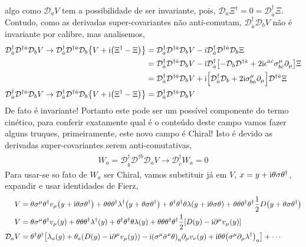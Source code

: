 algo como $\mathcal D_a V$ tem a possibilidade de ser invariante, pois, $\mathcal D_a\Xi^\dagger=0=\mathcal D^\dagger_{\dot a}\Xi$. Contudo, como as derivadas super-covariantes não anti-comutam, $\mathcal D^\dagger_{\dot a}\mathcal D_b V$ não é invariante por calibre, mas analisemos,
\begin{align*}
    \mathcal D^\dagger_{\dot a}\mathcal D^{\dagger \dot a}\mathcal D_b V\rightarrow\mathcal D^\dagger_{\dot a}\mathcal D^{\dagger \dot a}\mathcal D_b \qty{V+\textnormal{i}\qty(\Xi^\dagger-\Xi)}&=\mathcal D^\dagger_{\dot a}\mathcal D^{\dagger \dot a}\mathcal D_b V-\textnormal{i}\mathcal D^\dagger_{\dot a}\mathcal D^{\dagger \dot a}\mathcal D_b \Xi\\
    &=\mathcal D^\dagger_{\dot a}\mathcal D^{\dagger \dot a}\mathcal D_b V-\textnormal{i}\mathcal D^\dagger_{\dot a}\qty[-\mathcal D_b\mathcal D^{\dagger \dot a} +2\textnormal{i}\epsilon^{\dot a\dot c}\sigma^{\mu}_{b\dot c}\partial_\mu]\Xi\\
    &=\mathcal D^\dagger_{\dot a}\mathcal D^{\dagger \dot a}\mathcal D_b V+\textnormal{i}\qty[\mathcal D^\dagger_{\dot a}\mathcal D_b +2\textnormal{i}\sigma^{\mu}_{b\dot a}\partial_\mu]\mathcal D^{\dagger \dot a}\Xi\\
    \mathcal D^\dagger_{\dot a}\mathcal D^{\dagger \dot a}\mathcal D_b V\rightarrow\mathcal D^\dagger_{\dot a}\mathcal D^{\dagger \dot a}\mathcal D_b \qty{V+\textnormal{i}\qty(\Xi^\dagger-\Xi)}&=\mathcal D^\dagger_{\dot a}\mathcal D^{\dagger \dot a}\mathcal D_b V
\end{align*}
De fato é invariante! Portanto este pode ser um possível componente do termo cinético, para conferir exatamente qual é o conteúdo deste campo vamos fazer alguns truques, primeiramente, este novo campo é Chiral! Isto é devido as 
derivadas super-covariantes serem anti-comutativas,
\begin{align*}
    W_a=\mathcal D^\dagger_{\dot b}\mathcal D^{\dagger \dot b}\mathcal D_a V\rightarrow \mathcal D^\dagger_{\dot c}W_a=0
\end{align*}
Para usar-se so fato de $W_a$ ser Chiral, vamos substituir já em $V$, $x=y+\textnormal{i}\theta\sigma\theta^\dagger$, expandir e usar identidades de Fierz,
\begin{align*}
    V&=\theta\sigma^\mu\theta^\dagger v_\mu\qty(y+\textnormal{i}\theta\sigma\theta^\dagger)+\theta\theta\theta^\dagger\lambda^\dagger\qty(y+\theta\sigma\theta^\dagger)+\theta^\dagger\theta^\dagger\theta\lambda\qty(y+\textnormal{i}\theta\sigma\theta)+\theta\theta\theta^\dagger\theta^\dagger\frac12 D\qty(y+\theta\sigma\theta^\dagger)\\
    V&=\theta\sigma^\mu\theta^\dagger v_\mu\qty(y)+\theta\theta\theta^\dagger\lambda^\dagger\qty(y)+\theta^\dagger\theta^\dagger\theta\lambda\qty(y)+\theta\theta\theta^\dagger\theta^\dagger\frac12\qty[ D\qty(y)-\textnormal{i}\partial^\mu v_\mu\qty(y)]\\
    \mathcal D_aV&=\theta^\dagger\theta^\dagger\qty[\lambda_a\qty(y)+\theta_a\qty(D\qty(y)-\textnormal{i}\partial^\mu v_\mu\qty(y))-\textnormal{i}\qty(\sigma^\mu{\bar\sigma^\nu}\theta)_a\partial_\mu v_\nu\qty(y)+\textnormal{i}\theta\theta\qty(\sigma^\mu\partial_\mu\lambda^\dagger)_a]+\cdots
\end{align*}
